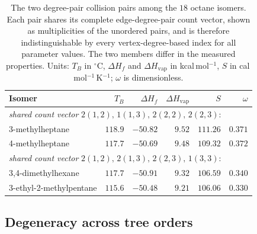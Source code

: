 \documentclass[a5paper, 10pt]{article}
\theoremstyle{plain}
\theoremstyle{remark}
\theoremstyle{definition}
\begin{document}
\begin{table}[htbp]
\centering
\caption{The two degree-pair collision pairs among the $18$ octane
isomers. Each pair shares its complete edge-degree-pair count vector,
shown as multiplicities of the unordered pairs, and is therefore
indistinguishable by every vertex-degree-based index for all
parameter values. The two members differ in the measured properties. Units: $T_B$ in
$^{\circ}$C, $\Delta H_f$ and $\Delta H_{\mathrm{vap}}$ in
kcal\,mol$^{-1}$, $S$ in cal\,mol$^{-1}$\,K$^{-1}$; $\omega$ is
dimensionless.}
\label{tab:collisions}
\small
\begin{tabular}{lrrrrr}
\toprule
Isomer & $T_B$ & $\Delta H_f$ & $\Delta H_{\mathrm{vap}}$ & $S$ & $\omega$\\
\midrule
\multicolumn{6}{l}{\emph{shared count vector} $2(1,2),\,1(1,3),\,2(2,2),\,2(2,3)$:}\\
3-methylheptane & $118.9$ & $-50.82$ & $9.52$ & $111.26$ & $0.371$\\
4-methylheptane & $117.7$ & $-50.69$ & $9.48$ & $109.32$ & $0.372$\\
\midrule
\multicolumn{6}{l}{\emph{shared count vector} $2(1,2),\,2(1,3),\,2(2,3),\,1(3,3)$:}\\
3,4-dimethylhexane & $117.7$ & $-50.91$ & $9.32$ & $106.59$ & $0.340$\\
3-ethyl-2-methylpentane & $115.6$ & $-50.48$ & $9.21$ & $106.06$ & $0.330$\\
\bottomrule
\end{tabular}
\end{table}

\subsection{Degeneracy across tree orders}\label{sec:degeneracy}
\end{document}
